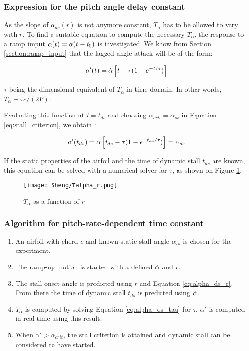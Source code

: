 \subsubsection{Expression for the pitch angle delay constant}
As the slope of $\alpha_{ds}(r)$ is not anymore constant, $T_\alpha$ has to be allowed to vary with $r$. To find a suitable equation to compute the necessary $T_{\alpha}$, the response to a ramp imput $\alpha(t) = \dot{\alpha}(t-t_0)$ is investigated. 
We know from Section \ref{section:ramp_input} that the lagged angle attack will be of the form:

\begin{equation}
\alpha'(t) = \dot{\alpha}\left[t- \tau(1-e^{-t/ \tau})\right]
\end{equation}

\noindent $\tau$ being the dimensional equivalent of $T_\alpha$ in time domain. In other words, $T_\alpha = \tau c/(2V)$.

Evaluating this function at $t=t_{ds}$ and choosing $\alpha_{crit}=\alpha_{ss}$ in Equation \eqref{eq:stall_criterion}, we obtain : 

\begin{equation}
\alpha'(t_{ds}) = \dot{\alpha}\left[t_{ds} - \tau(1-e^{-t_{ds} / \tau})\right] = \alpha_{ss}
\label{eq:alpha_ds_tau}
\end{equation}

If the static properties of the airfoil and the time of dynamic stall $t_{ds}$ are known, this equation can be solved with a numerical solver for $\tau$, as shown on Figure \ref{fig:Talpha_r}.

\begin{figure}[h]
	\centering
	\texttt{[image: Sheng/Talpha\_r.png]}
	\caption{$T_\alpha$ as a function of $r$}
	\label{fig:Talpha_r}
\end{figure}

\subsubsection{Algorithm for pitch-rate-dependent time constant}

\begin{enumerate}
\item An airfoil with chord $c$ and known static stall angle $\alpha_{ss}$ is chosen for the experiment. 
\item The ramp-up motion is started with a defined $\dot{\alpha}$ and $r$.
\item The stall onset angle is predicted using $r$ and Equation \eqref{eq:alpha_ds_r}. From there the time of dynamic stall $t_{ds}$ is predicted using $\dot{\alpha}$.
\item $T_\alpha$ is computed by solving Equation  \eqref{eq:alpha_ds_tau} for $\tau$. $\alpha'$ is computed in real time using this result. 
\item When $\alpha' > \alpha_{crit}$, the stall criterion is attained and dynamic stall can be considered to have started. 
\end{enumerate}

